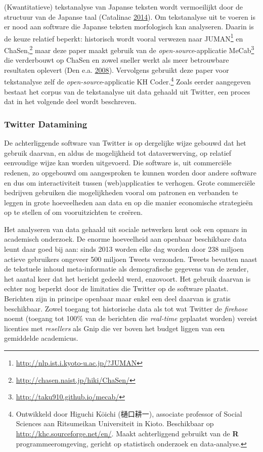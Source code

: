 \documentclass[10.5pt,dutch,]{article}
\begin{document}
(Kwantitatieve) tekstanalyse van Japanse teksten wordt vermoeilijkt door
de structuur van de Japanse taal (Catalinac
\protect\hyperlink{ref-catalinacux5fquantitativeux5f2014}{2014}). Om
tekstanalyse uit te voeren is er nood aan software die Japanse teksten
morfologisch kan analyseren. Daarin is de keuze relatief beperkt:
historisch wordt vooral verwezen naar JUMAN\footnote{\url{http://nlp.ist.i.kyoto-u.ac.jp/?JUMAN}}
en ChaSen,\footnote{\url{http://chasen.naist.jp/hiki/ChaSen/}} maar deze
paper maakt gebruik van de \emph{open-source}-applicatie MeCab\footnote{\url{http://taku910.github.io/mecab/}}
die verderbouwt op ChaSen en zowel sneller werkt als meer betrouwbare
resultaten oplevert (Den e.a.
\protect\hyperlink{ref-denux5fproperux5f2008}{2008}). Vervolgens
gebruikt deze paper voor tekstanalyse zelf de
\emph{open-source}-applicatie KH Coder.\footnote{Ontwikkeld door Higuchi
  Kōichi (樋口耕一), associate professor of Social Sciences aan
  Ritsumeikan Universiteit in Kioto. Beschikbaar op
  \url{http://khc.sourceforge.net/en/}. Maakt achterliggend gebruikt van
  de \textbf{R} programmeeromgeving, gericht op statistisch onderzoek en
  data-analyse.} Zoals eerder aangegeven bestaat het corpus van de
tekstanalyse uit data gehaald uit Twitter, een proces dat in het
volgende deel wordt beschreven.

\subsubsection{Twitter Datamining}\label{twitter-datamining}

De achterliggende software van Twitter is op dergelijke wijze gebouwd
dat het gebruik daarvan, en aldus de mogelijkheid tot dataverwerving, op
relatief eenvoudige wijze kan worden uitgevoerd. Die software is, uit
commerciële redenen, zo opgebouwd om aangesproken te kunnen worden door
andere software en dus om interactiviteit tussen (web)applicaties te
verhogen. Grote commerciële bedrijven gebruiken die mogelijkheden vooral
om patronen en verbanden te leggen in grote hoeveelheden aan data en op
die manier economische strategieën op te stellen of om vooruitzichten te
creëren.

Het analyseren van data gehaald uit sociale netwerken kent ook een
opmars in academisch onderzoek. De enorme hoeveelheid aan openbaar
beschikbare data leunt daar goed bij aan: sinds 2013 worden elke
dag worden door 238 miljoen actieve gebruikers ongeveer 500 miljoen
Tweets verzonden. Tweets bevatten naast de tekstuele inhoud
meta-informatie als demografische gegevens van de zender, het aantal
keer dat het bericht gedeeld werd, enzovoort. Het gebruik daarvan is
echter nog beperkt door de limitaties die Twitter op de software
plaatst. Berichten zijn in principe openbaar maar enkel een deel daarvan
is gratis beschikbaar. Zowel toegang tot historische data als tot wat
Twitter de \emph{firehose} noemt (toegang tot 100\% van de berichten die
\emph{real-time} geplaatst worden) vereist licenties met
\emph{resellers} als Gnip die ver boven het budget liggen van een
gemiddelde academicus.
\end{document}
